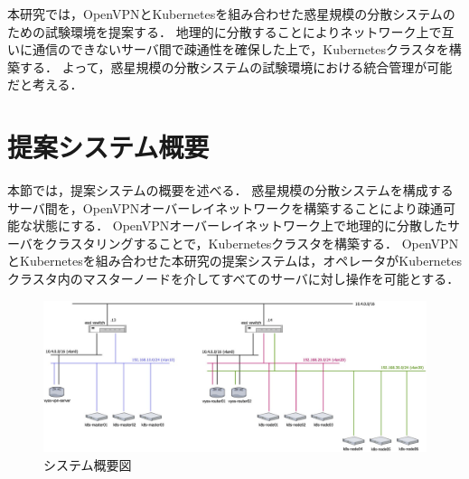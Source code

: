 本研究では，OpenVPNとKubernetesを組み合わせた惑星規模の分散システムのための試験環境を提案する．
地理的に分散することによりネットワーク上で互いに通信のできないサーバ間で疎通性を確保した上で，Kubernetesクラスタを構築する．
よって，惑星規模の分散システムの試験環境における統合管理が可能だと考える．

\section{提案システム概要}
\label{issue:about-system}

本節では，提案システムの概要を述べる．
惑星規模の分散システムを構成するサーバ間を，OpenVPNオーバーレイネットワークを構築することにより疎通可能な状態にする．
OpenVPNオーバーレイネットワーク上で地理的に分散したサーバをクラスタリングすることで，Kubernetesクラスタを構築する．
OpenVPNとKubernetesを組み合わせた本研究の提案システムは，オペレータがKubernetesクラスタ内のマスターノードを介してすべてのサーバに対し操作を可能とする．

\begin{figure}[htbp]
  \begin{center}
    \includegraphics[width=\textwidth]{./figures/system-diagram.jpg}
    \caption{システム概要図}
  \end{center}
\end{figure}

